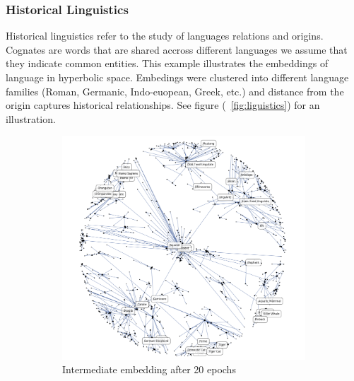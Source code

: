 \subsubsection{Historical Linguistics}
Historical linguistics refer to the study of languages relations and origins. Cognates are words that are shared accross different languages we assume that they indicate common entities. This example illustrates the embeddings of language in hyperbolic space. Embedings were clustered into different language families (Roman, Germanic, Indo-euopean, Greek, etc.) and distance from the origin captures historical relationships. See figure  (~\ref{fig:liguistics}) for an illustration.
\begin{figure}[htb]
    \centering
    \begin{adjustbox}{minipage=\linewidth,scale=0.7}
    \begin{subfigure}[b]{\columnwidth}
        \includegraphics[width=\textwidth]{lectures/11-b/Images/1-4.png}
            \caption{Intermediate embedding after 20 epochs}
            \label{fig:linguistics1}
        \vspace{0.7cm}
        \end{subfigure}
        \begin{subfigure}[b]{\columnwidth}

\end{subfigure}
\end{adjustbox}
\end{figure}
